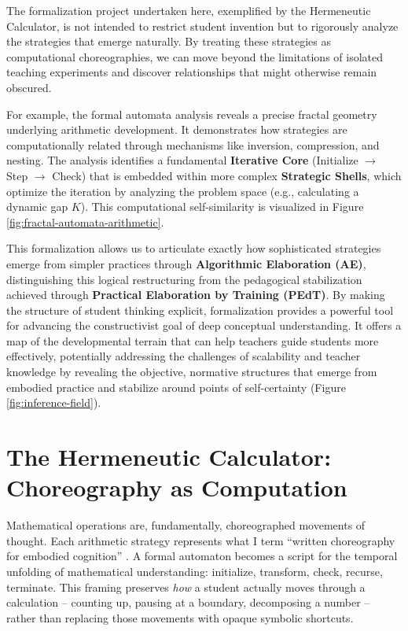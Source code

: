 \documentclass[12pt]{book}
\begin{document}
The formalization project undertaken here, exemplified by the Hermeneutic Calculator, is not intended to restrict student invention but to rigorously analyze the strategies that emerge naturally. By treating these strategies as computational choreographies, we can move beyond the limitations of isolated teaching experiments and discover relationships that might otherwise remain obscured.

For example, the formal automata analysis reveals a precise fractal geometry underlying arithmetic development. It demonstrates how strategies are computationally related through mechanisms like inversion, compression, and nesting. The analysis identifies a fundamental \textbf{Iterative Core} (Initialize $\rightarrow$ Step $\rightarrow$ Check) that is embedded within more complex \textbf{Strategic Shells}, which optimize the iteration by analyzing the problem space (e.g., calculating a dynamic gap $K$). This computational self-similarity is visualized in Figure \ref{fig:fractal-automata-arithmetic}.

This formalization allows us to articulate exactly how sophisticated strategies emerge from simpler practices through \textbf{Algorithmic Elaboration (AE)}, distinguishing this logical restructuring from the pedagogical stabilization achieved through \textbf{Practical Elaboration by Training (PEdT)}. By making the structure of student thinking explicit, formalization provides a powerful tool for advancing the constructivist goal of deep conceptual understanding. It offers a map of the developmental terrain that can help teachers guide students more effectively, potentially addressing the challenges of scalability and teacher knowledge by revealing the objective, normative structures that emerge from embodied practice and stabilize around points of self-certainty (Figure \ref{fig:inference-field}).

\section{The Hermeneutic Calculator: Choreography as Computation}

Mathematical operations are, fundamentally, choreographed movements of thought. Each arithmetic strategy represents what I term \enquote{written choreography for embodied cognition} \parencite{savich_hermeneutic_nodate}. A formal automaton becomes a script for the temporal unfolding of mathematical understanding: initialize, transform, check, recurse, terminate. This framing preserves \textit{how} a student actually moves through a calculation -- counting up, pausing at a boundary, decomposing a number -- rather than replacing those movements with opaque symbolic shortcuts.
\end{document}
